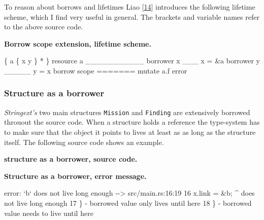 To reason about borrows and lifetimes Liao
{[}\protect\hyperlink{liao2014}{14}{]} introduces the following lifetime
scheme, which I find very useful in general. The brackets and va­ria­ble
names refer to the above source code.

\textbf{Borrow scope extension, lifetime scheme.}

\{ a \{ x y \} * \} resource a
\textbar{}\_\_\_\_\_\_\_\_\_\_\_\textbar{} borrower x
\textbar{}\_\_\_\textbar{} x = \&a borrower y
\textbar{}\_\_\_\_\_\textbar{} y = x borrow scope
\textbar{}=======\textbar{} mutate a.f \textbar{} error

\subsubsection{Structure as a borrower}\label{_structure_as_a_borrower}

\emph{Stringext's} two main structures \texttt{Mission} and
\texttt{Finding} are extensively borrowed throuout the source code. When
a structure holds a reference the type-system has to make sure that the
object it points to lives at least as as long as the structure itself.
The following source code shows an example.

\textbf{structure as a borrower, source code.}

\begin{Shaded}
\begin{Highlighting}[]
 
    \NormalTok{<}\NormalTok{>,}
\NormalTok{\}}

 \NormalTok{> \{}
     
\NormalTok{\}}

 
      \NormalTok{)\};}
      
      \NormalTok{\{}
          \NormalTok{)\};}
    \NormalTok{\}}
\NormalTok{\}}
\end{Highlighting}
\end{Shaded}

\textbf{Structure as a borrower, error message.}

error: `b` does not live long enough -\/-\textgreater{}
src/main.rs:16:19 \textbar{} 16 \textbar{} x.link = \&b; \textbar{} \^{}
does not live long enough 17 \textbar{} \} \textbar{} - borrowed value
only lives until here 18 \textbar{} \} \textbar{} - borrowed value needs
to live until here


